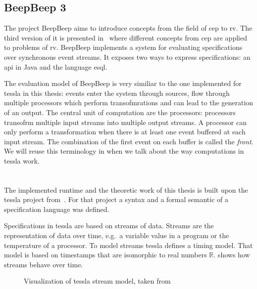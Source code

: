 \subsection{BeepBeep 3}
\label{sec:related:stream_based:beepbeep}

The project BeepBeep aims to introduce concepts from the field of \gls{cep} to \gls{rv}.
The third version of it is presented in~\cite{Hall2011} where different concepts from \gls{cep} are applied to problems of \gls{rv}.
BeepBeep implements a system for evaluating specifications over synchronous event streams.
It exposes two ways to express specifications: an \gls{api} in Java and the language \gls{esql}.

The evaluation model of BeepBeep is very similiar to the one implemented for \gls{tessla} in this thesis: events enter the system through sources, flow through multiple processors which perform transofmrations and can lead to the generation of an output.
The central unit of computation are the processors: processors transofrm multiple input streams into multiple output streams.
A processor can only perform a transformation when there is at least one event buffered at each input stream.
The combination of the first event on each buffer is called the \emph{front}.
We will reuse this terminology in  when we talk about the way computations in \gls{tessla} work.

\section{}
\label{sec:related:tessla}

The implemented runtime and the theoretic work of this thesis is built upon the \gls{tessla} project from~\cite{Decker2016}.
For that project a syntax and a formal semantic of a specification language was defined.

Specifications in \gls{tessla} are based on streams of data.
Streams are the representation of data over time, e.g.\ a variable value in a program or the temperature of a processor.
To model streams \gls{tessla} defines a timing model.
That model is based on timestamps that are isomorphic to real numbers \(\mathbb{R}\).
 shows how streams behave over time.

\begin{figure}
  
  \caption{Visualization of \gls{tessla} stream model, taken from~\cite{Decker2016}}
\label{fig:chap2:sec_tessla:streams}
\end{figure}

